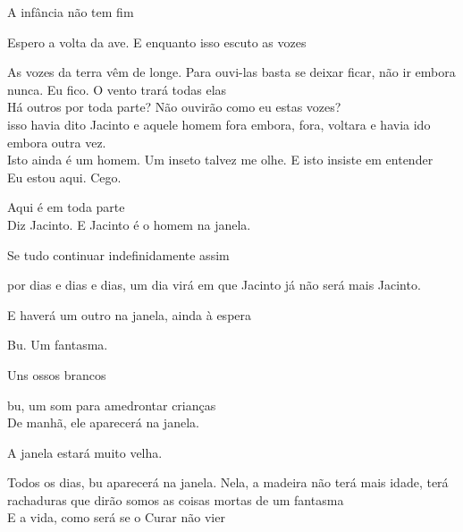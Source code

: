 A infância não tem fim

\breakk

\vspace*{4cm}

Espero a volta da ave. E enquanto isso escuto as vozes

As vozes da terra vêm de longe. Para ouvi-las basta se deixar ficar, não
ir embora nunca. Eu fico. O vento trará todas elas\\

Há outros por toda parte? Não ouvirão como eu estas vozes?\\

isso havia dito Jacinto e aquele homem fora embora, fora, voltara e
havia ido embora outra vez.\\

Isto ainda é um homem. Um inseto talvez me olhe. E isto insiste em
entender\\

Eu estou aqui. Cego.

Aqui é em toda parte\\

Diz Jacinto. E Jacinto é o homem na janela.

\breakk

\clearpage
\thispagestyle{empty}

\movetooddpage

\vspace*{4cm}

Se tudo continuar indefinidamente assim

por dias e dias e dias, um dia virá em que Jacinto já não será mais
Jacinto.

E haverá um outro na janela, ainda à espera

Bu. Um fantasma.

Uns ossos brancos

bu, um som para amedrontar crianças\\

De manhã, ele aparecerá na janela.

A janela estará muito velha.

Todos os dias, bu aparecerá na janela. Nela, a madeira não terá mais
idade, terá rachaduras que dirão somos as coisas mortas de um fantasma\\

E a vida, como será se o Curar não vier

\breakk
\pagecolor{black}

\chapter*{}
\pagecolor{black}\afterpage{\nopagecolor}


